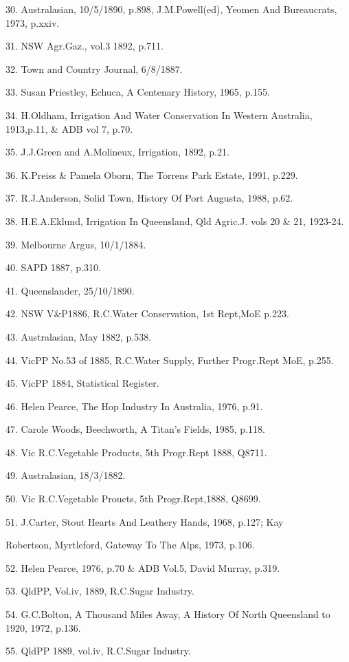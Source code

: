 30. Australasian, 10/5/1890, p.898, J.M.Powell(ed), Yeomen And Bureaucrats,
      1973, p.xxiv.

31. NSW Agr.Gaz., vol.3 1892, p.711.

32. Town and Country Journal, 6/8/1887.

33. Susan Priestley, Echuca, A Centenary History, 1965, p.155.

34. H.Oldham, Irrigation And Water Conservation In Western Australia,
      1913,p.11,  \& ADB vol 7, p.70.

35. J.J.Green and A.Molineux, Irrigation, 1892, p.21.

36. K.Preiss \& Pamela Oborn, The Torrens Park Estate, 1991, p.229.

37. R.J.Anderson, Solid Town, History Of Port Augusta, 1988, p.62.

38. H.E.A.Eklund, Irrigation In Queensland, Qld Agric.J. vols 20 \& 21, 
     1923-24.   

39. Melbourne Argus, 10/1/1884.

40. SAPD 1887, p.310.

41. Queenslander, 25/10/1890.

42. NSW V\&P1886, R.C.Water Conservation, 1st Rept,MoE p.223.

43. Australasian, May 1882, p.538.

44. VicPP No.53 of 1885, R.C.Water Supply, Further Progr.Rept
      MoE, p.255.

45. VicPP 1884, Statistical Register.

46. Helen Pearce, The Hop Industry In Australia, 1976, p.91.

47. Carole Woods, Beechworth, A Titan's Fields, 1985, p.118.

48. Vic R.C.Vegetable Products, 5th Progr.Rept 1888, Q8711.

49. Australasian, 18/3/1882.

50. Vic R.C.Vegetable Proucts, 5th Progr.Rept,1888, Q8699.

51. J.Carter, Stout Hearts And Leathery Hands, 1968, p.127; Kay

      Robertson, Myrtleford, Gateway To The Alps, 1973, p.106.

52. Helen Pearce, 1976, p.70 \& ADB Vol.5, David Murray, p.319.

53. QldPP, Vol.iv, 1889, R.C.Sugar Industry.

54. G.C.Bolton, A Thousand Miles Away, A History Of North Queensland
       to 1920, 1972, p.136. 		

55. QldPP 1889, vol.iv, R.C.Sugar Industry.

